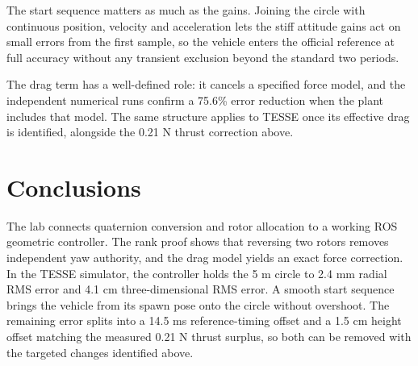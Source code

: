 \documentclass[12pt,a4paper,twoside]{article}
\begin{document}
The start sequence matters as much as the gains. Joining the circle with continuous position, velocity and acceleration lets the stiff attitude gains act on small errors from the first sample, so the vehicle enters the official reference at full accuracy without any transient exclusion beyond the standard two periods.

The drag term has a well-defined role: it cancels a specified force model, and the independent numerical runs confirm a 75.6\% error reduction when the plant includes that model. The same structure applies to TESSE once its effective drag is identified, alongside the 0.21 N thrust correction above.

\section{Conclusions}
The lab connects quaternion conversion and rotor allocation to a working ROS geometric controller. The rank proof shows that reversing two rotors removes independent yaw authority, and the drag model yields an exact force correction. In the TESSE simulator, the controller holds the 5 m circle to 2.4 mm radial RMS error and 4.1 cm three-dimensional RMS error. A smooth start sequence brings the vehicle from its spawn pose onto the circle without overshoot. The remaining error splits into a 14.5 ms reference-timing offset and a 1.5 cm height offset matching the measured 0.21 N thrust surplus, so both can be removed with the targeted changes identified above.



\end{document}
